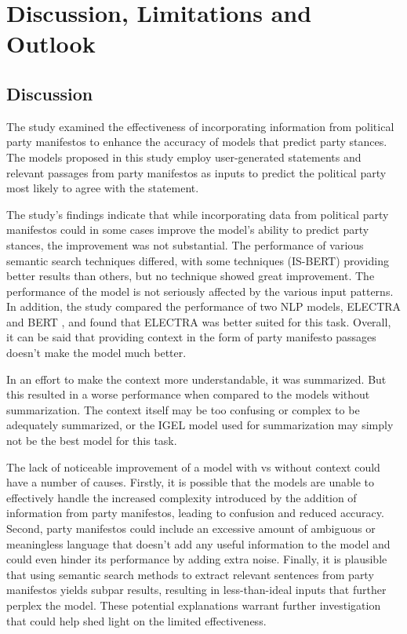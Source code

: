 \chapter{Discussion, Limitations and Outlook}\label{discussion}

\section{Discussion}

The study examined the effectiveness of incorporating information from political party manifestos to enhance the accuracy of models that predict party stances. The models proposed in this study employ user-generated statements and relevant passages from party manifestos as inputs to predict the political party most likely to agree with the statement.

The study's findings indicate that while incorporating data from political party manifestos could in some cases improve the model's ability to predict party stances, the improvement was not substantial. The performance of various semantic search techniques differed, with some techniques (IS-BERT) providing better results than others, but no technique showed great improvement. The performance of the model is not seriously affected by the various input patterns. In addition, the study compared the performance of two NLP models, ELECTRA \citep{clark2020electra} and BERT \citep{devlin2018bert}, and found that ELECTRA was better suited for this task. Overall, it can be said that providing context in the form of party manifesto passages doesn't make the model much better.

In an effort to make the context more understandable, it was summarized. But this resulted in a worse performance when compared to the models without summarization. The context itself may be too confusing or complex to be adequately summarized, or the IGEL model \citep{igel} used for summarization may simply not be the best model for this task.

The lack of noticeable improvement of a model with vs without context could have a number of causes. Firstly, it is possible that the models are unable to effectively handle the increased complexity introduced by the addition of information from party manifestos, leading to confusion and reduced accuracy. Second, party manifestos could include an excessive amount of ambiguous or meaningless language that doesn't add any useful information to the model and could even hinder its performance by adding extra noise. Finally, it is plausible that using semantic search methods to extract relevant sentences from party manifestos yields subpar results, resulting in less-than-ideal inputs that further perplex the model. These potential explanations warrant further investigation that could help shed light on the limited effectiveness.

